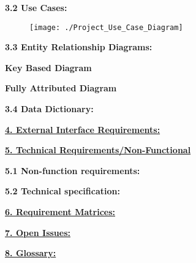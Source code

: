 \documentclass[12pt]{article}
\begin{document}
		
	\vspace{0.2in}
	
		\textbf{3.2 Use Cases:} %
		\vspace{0.1in}
			\begin{figure}[htbp] %
				\centering
				\texttt{[image: ./Project\_Use\_Case\_Diagram]}
			\end{figure}
		
		
		
	\vspace{0.2in}
	
		\textbf{3.3 Entity Relationship Diagrams:}
		\vspace{0.2in}
		

		\vspace{0.1in}

			\begin{center}
			\textbf{Key Based Diagram}
			\end{center}
		
		\vspace{0.3in}
		
		
		\begin{center}
			\textbf{Fully Attributed Diagram}
			\end{center}
		
		\vspace{0.3in}
		
		

		
	\vspace{0.1in}
	
		\textbf{3.4 Data Dictionary:}
		\vspace{0.1in}
		
		
	\vspace{0.5in}
	
	\textbf{\underline{4. External Interface Requirements:}}
	\vspace{0.2in}
	
	
	
	\vspace{0.5in}
	
	\textbf{\underline{5. Technical Requirements/Non-Functional}}
	\vspace{0.2in}
	
		\textbf{5.1 Non-function requirements:} %
		\vspace{0.1in}
				
		\textbf{5.2 Technical specification:} %
		\vspace{0.1in}
	
	\vspace{0.5in}
	
	\newpage
	\textbf{\underline{6. Requirement Matrices:}}
	\vspace{0.2in}
	
	
	
	\vspace{0.5in}
	
	\textbf{\underline{7. Open Issues:}}		
	\vspace{0.2in}
	
	
	
	\vspace{0.5in}
	
	\textbf{\underline{8. Glossary:}}
	\vspace{0.2in}
		
	
	\vspace{0.5in}
		
\end{document}
